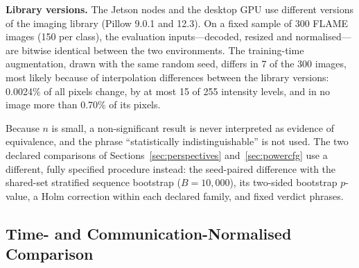 \documentclass[journal]{IEEEtran}
\begin{document}
\textbf{Library versions.} The Jetson nodes and the desktop GPU use different versions of the imaging library (Pillow 9.0.1 and 12.3). On a fixed sample of 300 FLAME images (150 per class), the evaluation inputs---decoded, resized and normalised---are bitwise identical between the two environments. The training-time augmentation, drawn with the same random seed, differs in 7 of the 300 images, most likely because of interpolation differences between the library versions: 0.0024\% of all pixels change, by at most 15 of 255 intensity levels, and in no image more than 0.70\% of its pixels.

Because $n$ is small, a non-significant result is never interpreted as evidence of equivalence, and the phrase ``statistically indistinguishable'' is not used. The two declared comparisons of Sections~\ref{sec:perspectives} and~\ref{sec:powercfg} use a different, fully specified procedure instead: the seed-paired difference with the shared-set stratified sequence bootstrap ($B=10{,}000$), its two-sided bootstrap $p$-value, a Holm correction within each declared family, and fixed verdict phrases.

\subsection{Time- and Communication-Normalised Comparison}
\label{sec:timecomm}
\end{document}
